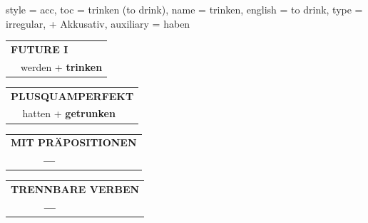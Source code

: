\begin{verbentry}{
  style = {acc},
  toc = {trinken (to drink)},
  name = {trinken},
  english = {to drink},
  type = {irregular, + Akkusativ},
  auxiliary = {haben}
}
\begin{tabular}{rl}
    \multicolumn{2}{l}{\textbf{FUTURE I} }\\
   & werden + \textbf{trinken}\\
 
  \end{tabular}
\hfill
   \begin{tabular}{rl}
      \multicolumn{2}{l}{\textbf{PLUSQUAMPERFEKT}}\\
   & hatten + \textbf{getrunken}\\
  \end{tabular}
  
  
\vspace{10pt}

\begin{tabular}{lll}
\multicolumn{3}{l}{\textbf{MIT PRÄPOSITIONEN}}\\
& \textbf{---} & \\
\end{tabular}
\hfill
\begin{tabular}{lll}
\multicolumn{3}{l}{\textbf{TRENNBARE VERBEN}}\\
& \textbf{---} & \\
\end{tabular}
\vspace{-5pt}
\end{verbentry}


